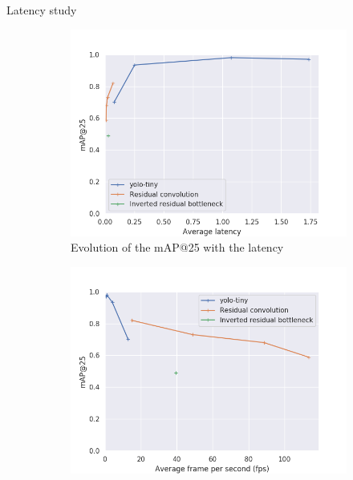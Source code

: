 \documentclass{beamer}
\begin{document}
\begin{frame}{Latency study}
    \begin{figure}
      \begin{center}
        \begin{subfigure}[t]{.49\linewidth}
          \centering
          \includegraphics[width=0.99\linewidth]{figures/map_at_25_latency_models.png}
          \caption{Evolution of the mAP@25 with the latency}
        \end{subfigure}
        \begin{subfigure}[t]{.49\linewidth}
          \centering
          \includegraphics[width=0.99\linewidth]{figures/map_at_25_fps_models.png}

\end{subfigure}
\end{center}
\end{figure}
\end{frame}
\end{document}
